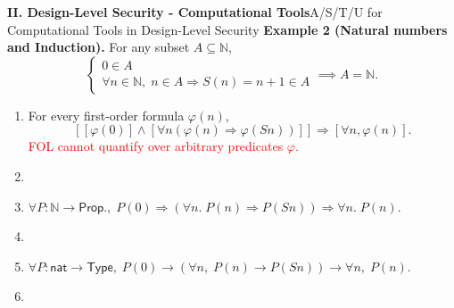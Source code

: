 \documentclass[10pt,aspectratio=1610,compress,dvipsnames]{beamer}
\begin{document}
\begin{frame}[fragile]{\bfseries II. Design-Level Security - Computational Tools}{A/S/T/U for Computational Tools in Design-Level Security}
\textbf{Example 2 (Natural numbers and Induction).}\; For any subset $A\subseteq\mathbb N$, \[
\begin{cases}
0\in A\\
\forall n\in\mathbb N,\; n\in A\Rightarrow S(n)=n+1\in A
\end{cases}\implies A=\mathbb N.
\]
\begin{enumerate}[$\bullet$]
	\item[FOL] For every first-order formula $\varphi(n)$, \[
	\left[[\varphi(0)] \wedge [\forall n(\varphi(n)\Rightarrow \varphi(Sn))]\right]
	\Rightarrow [\forall n,\varphi(n)].
	\] \textcolor{red}{FOL cannot quantify over arbitrary predicates $\varphi$.}
	\item[]
	\item[HOL] $
	\forall P:\mathbb{N}\to\mathsf{Prop.},\;
	P(0)\Rightarrow (\forall n.\;P(n)\Rightarrow P(Sn)) \Rightarrow \forall n.\;P(n).$
	\item[]
	\item[CIC] $\forall P:\mathsf{nat}\to\mathsf{Type},\;
	P(0)\to (\forall n,\;P(n)\to P(Sn)) \to \forall n,\;P(n).$
	\item[] 
\end{enumerate}
\vfill
\end{frame}
\end{document}
